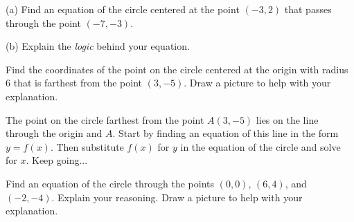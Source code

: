 \documentclass{ximera}
\begin{document}
\begin{question}  \label{Q8dsf8r3tg;lyhg}
(a) Find an equation of the circle centered at the point $(-3,2)$ that passes through the point $(-7,-3)$. 

(b) Explain the \emph{logic} behind your equation. 
\end{question}



\begin{question}  \label{Q:df454tt4443}
Find the coordinates of the point on the circle centered at the origin with radius $6$ that is farthest from the point $(3,-5)$. Draw a picture to help with your explanation.

\begin{hint}
The point on the circle farthest from the point $A(3,-5)$ lies on the line through the origin and $A$. Start by finding an equation of this line in the form $y=f(x)$. Then substitute $f(x)$ for $y$ in the equation of the circle and solve for $x$. Keep going...
\end{hint}

\end{question}

\begin{question} \label{Qsdfl4345r3}
Find an equation of the circle through the points $(0,0)$, $(6,4)$, and $(-2,-4)$. Explain your reasoning. Draw a picture to help with your explanation.

\end{question}





\end{document}
